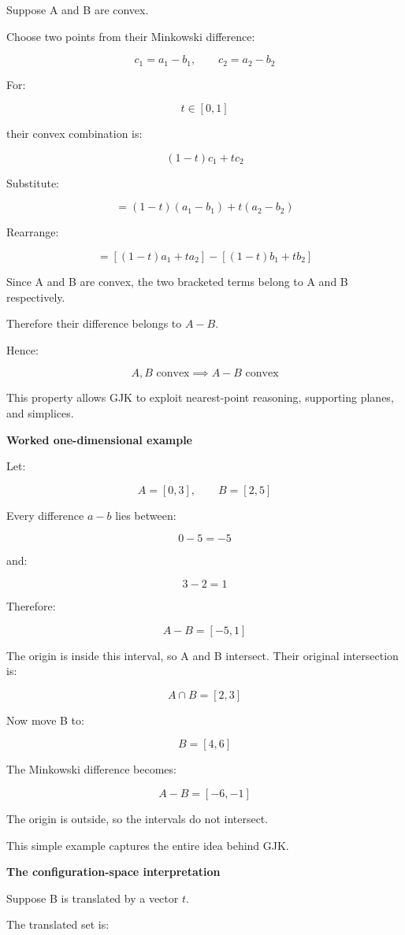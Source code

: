 Suppose A and B are convex.

Choose two points from their Minkowski difference:

\[
c_1=a_1-b_1,\qquad c_2=a_2-b_2
\]

For:

\[
t\in[0,1]
\]

their convex combination is:

\[
(1-t)c_1+tc_2
\]

Substitute:

\[
=(1-t)(a_1-b_1)+t(a_2-b_2)
\]

Rearrange:

\[
=[(1-t)a_1+ta_2]-[(1-t)b_1+tb_2]
\]

Since A and B are convex, the two bracketed terms belong to A and B respectively.

Therefore their difference belongs to \(A-B\).

Hence:

\[
\boxed{ A,B\text{ convex}\implies A-B\text{ convex} }
\]

This property allows GJK to exploit nearest-point reasoning, supporting planes, and simplices.

\textbf{Worked one-dimensional example}

Let:

\[
A=[0,3],\qquad B=[2,5]
\]

Every difference \(a-b\) lies between:

\[
0-5=-5
\]

and:

\[
3-2=1
\]

Therefore:

\[
A-B=[-5,1]
\]

The origin is inside this interval, so A and B intersect. Their original intersection is:

\[
A\cap B=[2,3]
\]

Now move B to:

\[
B=[4,6]
\]

The Minkowski difference becomes:

\[
A-B=[-6,-1]
\]

The origin is outside, so the intervals do not intersect.

This simple example captures the entire idea behind GJK.

\textbf{The configuration-space interpretation}

Suppose B is translated by a vector \(t\).

The translated set is:

